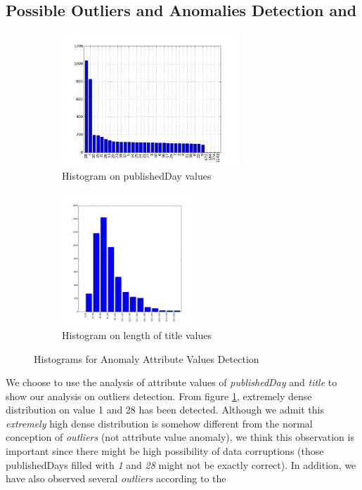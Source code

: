 \documentclass[10pt, oneside]{article}
\begin{document}
\subsection*{Possible Outliers and Anomalies Detection and}
\begin{figure}[H]
   \centering
   \begin{subfigure}{0.4\textwidth}
   	\centering
   	\includegraphics[height = 5cm]{publishedDay.png}  
   	\caption{Histogram on publishedDay values}
  	 \label{fig:publishedDay}
   \end{subfigure}
   \begin{subfigure}{0.4\textwidth}
   	\centering
   	\includegraphics[height = 5cm]{title.png}  
   	\caption{Histogram on length of title values}
  	 \label{fig:title}
   \end{subfigure}
   \caption{Histograms for Anomaly Attribute Values Detection}
\end{figure}
We choose to use the analysis of attribute values of \textit{publishedDay} and \textit{title} to show our analysis on outliers detection. From figure \ref{fig:publishedDay},
extremely dense distribution on value 1 and 28 has been detected. Although we admit this \textit{extremely} high dense distribution is somehow different from 
the normal conception of \textit{outliers} (not attribute value anomaly), we think this observation is important since there might be high possibility of data corruptions 
(those publishedDays filled with \textit{1} and \textit{28} might not be exactly correct). In addition, we have also observed several \textit{outliers} according to the 
\end{document}
